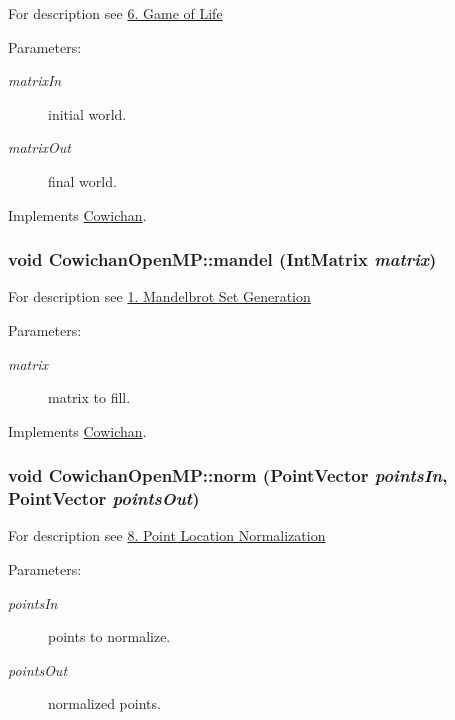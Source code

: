 For description see \hyperlink{index_life_sec}{6. Game of Life} \begin{Desc}
\item[Parameters:]
\begin{description}
\item[{\em matrixIn}]initial world. \item[{\em matrixOut}]final world. \end{description}
\end{Desc}


Implements \hyperlink{class_cowichan_d449595ef2fe934bdd128ac8b1f51d07}{Cowichan}.\hypertarget{class_cowichan_open_m_p_6809c2738792de047ee59259636c1afd}{
\subsubsection[{mandel}]{\setlength{\rightskip}{0pt plus 5cm}void CowichanOpenMP::mandel ({\bf IntMatrix} {\em matrix})}}
\label{class_cowichan_open_m_p_6809c2738792de047ee59259636c1afd}


For description see \hyperlink{index_mandel_sec}{1. Mandelbrot Set Generation} \begin{Desc}
\item[Parameters:]
\begin{description}
\item[{\em matrix}]matrix to fill. \end{description}
\end{Desc}


Implements \hyperlink{class_cowichan_ec6cc4eb2ad444474b923532167e98a2}{Cowichan}.\hypertarget{class_cowichan_open_m_p_4ffbe36816235bc6abec30eae2be2d78}{
\subsubsection[{norm}]{\setlength{\rightskip}{0pt plus 5cm}void CowichanOpenMP::norm ({\bf PointVector} {\em pointsIn}, \/  {\bf PointVector} {\em pointsOut})}}
\label{class_cowichan_open_m_p_4ffbe36816235bc6abec30eae2be2d78}


For description see \hyperlink{index_norm_sec}{8. Point Location Normalization} \begin{Desc}
\item[Parameters:]
\begin{description}
\item[{\em pointsIn}]points to normalize. \item[{\em pointsOut}]normalized points. \end{description}
\end{Desc}


